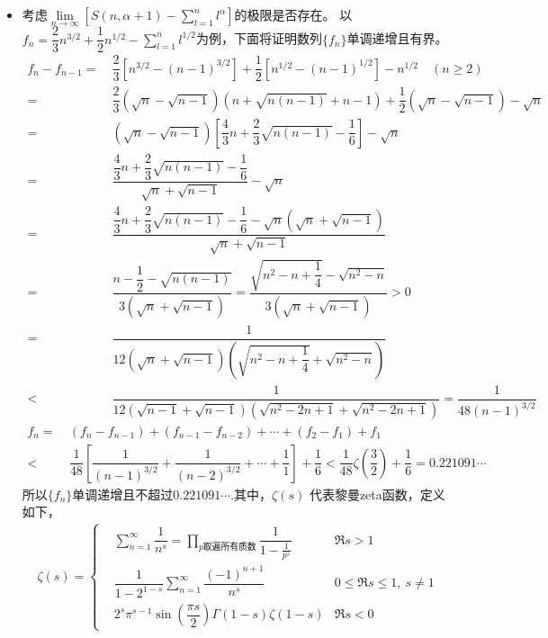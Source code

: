 \begin{itemize}[leftmargin=\inteval{\myitemleftmargin}pt,itemsep=
   \inteval{\myitemitempsep}pt,topsep=\inteval{\myitemtopsep}pt]
\item 考虑$ \lim\limits_{n\to \infty}\left[S(n,\alpha+1)-\sum\limits_{l=1}^{n} l^{\alpha}\right] $的极限是否存在。
以$ f_n=\dfrac{2}{3}n^{3/2}+\dfrac{1}{2}n^{1/2}-\sum\limits_{l=1}^{n} 
l^{1/2} $为例，下面将证明数列$ \{f_n\} $单调递增且有界。
\begin{align*}
    f_n-f_{n-1}=&\ \dfrac{2}{3}\left[n^{3/2}-(n-1)^{3/2}\right]
    +\dfrac{1}{2}\left[n^{1/2}-(n-1)^{1/2}\right]-n^{1/2} \quad (n\geq 2)\\
    =&\ \dfrac{2}{3}(\sqrt{n}-\sqrt{n-1})(n+\sqrt{n(n-1)}+n-1)
    +\dfrac{1}{2}(\sqrt{n}-\sqrt{n-1})-\sqrt{n} \\
    =&\ (\sqrt{n}-\sqrt{n-1})\left[\dfrac{4}{3}n+\dfrac{2}{3}
    \sqrt{n(n-1)}-\dfrac{1}{6}\right]-\sqrt{n} \\
    =&\ \dfrac{\dfrac{4}{3}n+\dfrac{2}{3}
        \sqrt{n(n-1)}-\dfrac{1}{6}}{\sqrt{n}+\sqrt{n-1}}-\sqrt{n} \\
    =&\ \dfrac{\dfrac{4}{3}n+\dfrac{2}{3}\sqrt{n(n-1)}-\dfrac{1}{6}-
        \sqrt{n}(\sqrt{n}+\sqrt{n-1})}{\sqrt{n}+\sqrt{n-1}} \\
    =&\ \dfrac{n-\dfrac{1}{2}-\sqrt{n(n-1)}}{3(\sqrt{n}+\sqrt{n-1})}
    =\dfrac{\sqrt{n^2-n+\dfrac{1}{4}}-\sqrt{n^2-n}}{3(\sqrt{n}+\sqrt{n-1})}>0 \\
    =&\ \dfrac{1}{12(\sqrt{n}+\sqrt{n-1})\left(\sqrt{n^2-n+\dfrac{1}{4}}+
        \sqrt{n^2-n}\right)} \\
    <&\ \dfrac{1}{12(\sqrt{n-1}+\sqrt{n-1})\left(\sqrt{n^2-2n+1}+\sqrt{n^2-2n+1}
        \right)}=\dfrac{1}{48(n-1)^{3/2}}
\end{align*}
\begin{align*}
    f_n=&\ (f_{n}-f_{n-1})+(f_{n-1}-f_{n-2})+\cdots+(f_{2}-f_{1})+f_1 \\
    <&\ \dfrac{1}{48}\left[\dfrac{1}{(n-1)^{3/2}}+\dfrac{1}{(n-2)^{3/2}}
    +\cdots+\dfrac{1}{1}\right]+\dfrac{1}{6} <\dfrac{1}{48}\zeta\left(
    \dfrac{3}{2}\right)+\dfrac{1}{6}=0.221091\cdots
\end{align*}
所以$ \{f_n\} $单调递增且不超过$ 0.221091\cdots $.其中，$ \zeta(s) $
代表黎曼zeta函数，定义如下，
\begin{align*}
    \zeta(s)=\left\{
    \begin{aligned}
        & \sum\limits_{n=1}^{\infty} \dfrac{1}{n^s}
        =\prod_{p\text{取遍所有质数}}\dfrac{1}{1-\frac{1}{p^s}}  & \Re s>1  \\
        & \dfrac{1}{1-2^{1-s}}\sum_{n=1}^{\infty}
        \dfrac{(-1)^{n+1}}{n^s}  & 0\leq \Re s\leq 1,\ s\neq 1   \\
        & 2^s\pi^{s-1}\sin\left(\dfrac{\pi s}{2}\right)\Gamma(1-s)
        \zeta(1-s) & \Re s<0 
    \end{aligned} 
    \right.
\end{align*}


\end{itemize}
